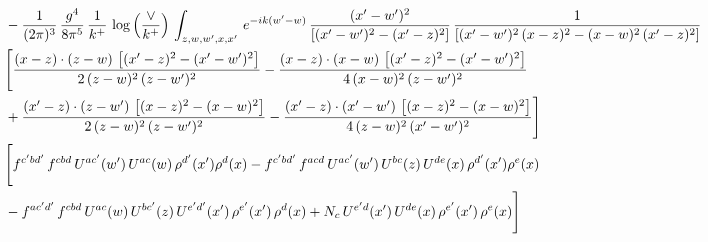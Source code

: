 \documentclass[9pt]{article}
\numberwithin{equation}{section}
\begin{document}
\begin{align}
& -\frac{1}{(2\pi)^{3}}\, \frac{g^{4}}{8\pi^{5}}\,\frac{1}{k^{+}}\,\log{\left(\frac{\vee}{k^{+}}\right)}\,\int_{z,w,w^{\prime},x,x'}\, e^{-ik(w^{\prime}-w)}\, \frac{(x'-w')^{2}}{\left[(x'-w')^{2}-(x'-z)^{2}\right]}\, \frac{1}{\left[(x'-w')^{2}\, (x-z)^{2} - (x-w)^{2}\, (x'-z)^{2}\right]}  \notag \\ & \Bigg[\frac{(x-z)\cdot (z-w)\, \left[(x'-z)^{2}-(x'-w')^{2}\right]}{2\, (z-w)^{2}\, (z-w')^{2}}  - \frac{(x-z)\cdot (x-w)\,\left[(x'-z)^{2}-(x'-w')^{2}\right] }{4\,(x-w)^{2}\,(z-w')^{2}}\notag \\ & +\frac{(x'-z)\cdot (z-w')\, \left[(x-z)^{2}-(x-w)^{2}\right]}{2\, (z-w)^{2}\, (z-w')^{2}}-\frac{(x'-z)\cdot (x'-w')\, \left[(x-z)^{2}-(x-w)^{2}\right]}{4\, (z-w)^{2}\,(x'-w')^{2}}\Bigg]\notag \\ & \Bigg[f^{c'bd'}\,f^{cbd}\, U^{ac'}(w')\,U^{ac}(w)\,\rho^{d'}(x')\rho^{d}(x)- f^{c'bd'}\,f^{acd}\,U^{ac'}(w')\,U^{bc}(z)\,U^{de}(x)\,\rho^{d'}(x')\rho^{e}(x) \notag \\ & -f^{ac'd'}\,f^{cbd}\,U^{ac}(w)\,U^{bc'}(z)\,U^{e'd'}(x')\,\rho^{e'}(x')\,\rho^{d}(x) +N_{c}\,U^{e'd}(x')\,U^{de}(x)\,\rho^{e'}(x')\,\rho^{e}(x)\Bigg]
\end{align}
\end{document}
